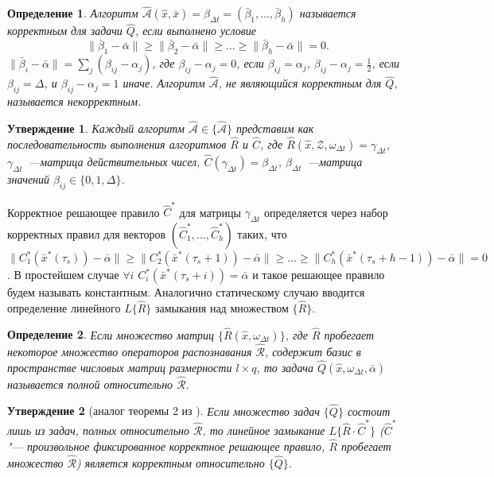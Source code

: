 \documentclass[a4paper, 12pt]{article}
\theoremstyle{plain}
\newtheorem{Pred}{Утверждение}
\newtheorem{Def}{Определение}
\begin{document}
	\begin{Def}
		Алгоритм $\hat{\mathcal{A}}(\hat{x},\bar{x})=\beta_{\Delta{t}}=(\bar{\beta}_1,\dots,\bar{\beta}_h)$ называется корректным для задачи $\hat{Q}$, если выполнено условие
		\[
		\|\bar{\beta}_1-\bar{\alpha}\|\geqslant\|\bar{\beta}_2-\bar{\alpha}\|\geqslant\dots
		\geqslant\|\bar{\beta}_h-\bar{\alpha}\|=0.
		\]
		$\|\bar{\beta}_i-\bar{\alpha}\|=
		\sum_j{(\beta_{ij}-\alpha_j)}$, где $\beta_{ij}-\alpha_j=0$, если $\beta_{ij}=\alpha_j$, $\beta_{ij}-\alpha_j=\frac{1}{2}$, если $\beta_{ij}=\Delta$, и $\beta_{ij}-\alpha_j=1$ иначе. Алгоритм $\hat{\mathcal{A}}$, не являющийся корректным для $\hat{Q}$, называется некорректным.
	\end{Def}
	
	\begin{Pred}
		\label{st:decompositon_dyn}
		Каждый алгоритм $\hat{\mathcal{A}}\in\{\hat{\mathcal{A}}\}$ представим как последовательность выполнения алгоритмов $\hat{R}$ и $\hat{C}$, где $\hat{R}(\hat{x}, \mathcal{Z}, \omega_{\Delta{t}})=\gamma_{\Delta{t}}$, $\gamma_{\Delta{t}}$~---матрица действительных чисел, $\hat{C}(\gamma_{\Delta{t}})=\beta_{\Delta{t}}$, $\beta_{\Delta{t}}$~---матрица значений $\beta_{ij}\in\{0,1,\Delta\}$.
	\end{Pred}
	
	Корректное решающее правило $\hat{C}^*$ для матрицы $\gamma_{\Delta{t}}$ определяется через набор корректных правил для векторов $(
	\hat{C}_1^*, \dots, \hat{C}_h^*)$ таких, что $\|C_1^*(\bar{x}^*(\tau_s))-\bar{\alpha}\|\geqslant\|C_2^*(\bar{x}^*(\tau_s+1))-\bar{\alpha}\|\geqslant\dots\geqslant\|C_h^*(\bar{x}^*(\tau_s+h-1))-\bar{\alpha}\|=0$. В простейшем случае $\forall{i}$ $C_i^*(\bar{x}^*(\tau_s+i))=\bar{\alpha}$ и такое решающее правило будем называть константным. Аналогично статическому случаю вводится определение линейного $L\{\hat{R}\}$ замыкания над множеством $\{\hat{R}\}$. 
	
	\begin{Def}
		Если множество матриц $\{\hat R(\hat x,\omega_{\Delta t})\}$, где $\hat R$ пробегает некоторое множество операторов распознавания $\hat{\mathcal R}$, содержит базис в пространстве числовых матриц размерности $l\times q$, то задача $\hat Q(\hat x,\omega_{\Delta t},\bar{\alpha})$ называется полной относительно $\hat{\mathcal R}$.
	\end{Def}
	
	\begin{Pred}[аналог теоремы 2 из \cite{Zhuravlev1977}]
		\label{pred:correctness_d}
		Если множество задач $\{\hat Q\}$ состоит лишь из задач, полных относительно $\hat{\mathcal R}$, то линейное замыкание $L\{\hat R{\cdot}\hat C^*\}$ ($\hat C^*$ "--- произвольное фиксированное корректное решающее правило, $\hat R$ пробегает множество $\hat{\mathcal R}$) является корректным относительно $\{\hat Q\}$.
	\end{Pred}
		
\end{document}
